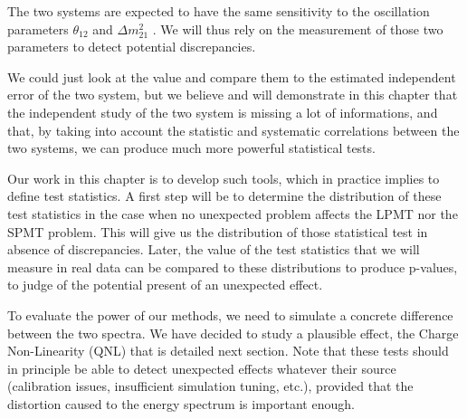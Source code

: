 \documentclass[../main.tex]{subfiles}
\begin{document}
The two systems are expected to have the same sensitivity to the oscillation parameters $\theta_{12}$ and $\Delta m^2_{21}$ \cite{juno_collaboration_sub-percent_2022}. We will thus rely on the measurement of those two parameters to detect potential discrepancies.

We could just look at the value and compare them to the estimated independent error of the two system, but we believe and will demonstrate in this chapter that the independent study of the two system is missing a lot of informations, and that, by taking into account the statistic and systematic correlations between the two systems, we can produce much more powerful statistical tests.

Our work in this chapter is to develop such tools, which in practice implies to define test statistics. A first step will be to determine the distribution of these test statistics in the case  when no unexpected problem affects the LPMT nor the SPMT problem. This will give us the distribution of those statistical test in absence of discrepancies. Later, the value of the test statistics that we will measure in real data can be compared to these distributions to produce p-values, to judge of the potential present of an unexpected effect.

To evaluate the power of our methods, we need to simulate a concrete difference between the two spectra. We have decided to study a plausible effect, the Charge Non-Linearity (QNL) that is detailed next section.
Note that these tests should in principle be able to detect unexpected effects whatever their source (calibration issues, insufficient simulation tuning, etc.), provided that the distortion caused to the energy spectrum is important enough.
\end{document}
